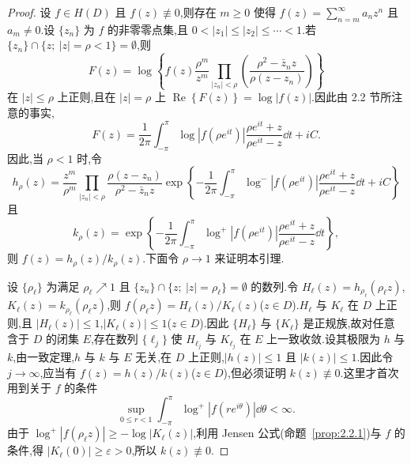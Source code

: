 \begin{proof}
设 $f \in H(D)$ 且 $f(z) \not\equiv 0$,则存在 $m \geq 0$ 使得 $f(z) = \sum_{n=m}^{\infty}a_{n}z^{n}$ 且 $a_{m} \neq 0$.设 $\{z_{n}\}$ 为 $f$ 的非零零点集,且 $0 < |z_{1}| \leq |z_{2}| \leq \cdots < 1$.若 $\{z_{n}\} \cap \{z;\ |z| = \rho < 1\} = \emptyset$,则
\begin{equation*}
F(z) = \log\left\{f(z)\frac{\rho^{m}}{z^{m}}\prod_{|z_{n}| < \rho}\left(\frac{\rho^{2} - \bar{z}_{n}z}{\rho(z - z_{n})}\right)\right\}
\end{equation*}
在 $|z| \leq \rho$ 上正则,且在 $|z| = \rho$ 上 $\operatorname{Re}\left\{F(z)\right\} = \log|f(z)|$.因此由 2.2 节所注意的事实,
\begin{equation*}
F(z) = \frac{1}{2\pi}\int_{-\pi}^{\pi}\log|f(\rho e^{it})|\frac{\rho e^{it} + z}{\rho e^{it} - z}\dd t + iC.
\end{equation*}
因此,当 $\rho < 1$ 时,令
\begin{equation*}
h_{\rho}(z) = \frac{z^{m}}{\rho^{m}}\prod_{|z_{n}| < \rho}\frac{\rho(z - z_{n})}{\rho^{2} - \bar{z}_{n}z}\exp\left\{-\frac{1}{2\pi}\int_{-\pi}^{\pi}\log^{-}|f(\rho e^{it})|\frac{\rho e^{it} + z}{\rho e^{it} - z}\dd t + iC\right\}
\end{equation*}
且
\begin{equation*}
k_{\rho}(z) = \exp\left\{-\frac{1}{2\pi}\int_{-\pi}^{\pi}\log^{+}|f(\rho e^{it})|\frac{\rho e^{it} + z}{\rho e^{it} - z}\dd t\right\},
\end{equation*}
则 $f(z) = h_{\rho}(z)/k_{\rho}(z)$.下面令 $\rho \to 1$ 来证明本引理.

设 $\{\rho_{\ell}\}$ 为满足 $\rho_{\ell} \nearrow 1$ 且 $\{z_{n}\} \cap \{z;\ |z| = \rho_{\ell}\} = \emptyset$ 的数列.令 $H_{\ell}(z) = h_{\rho_{\ell}}(\rho_{\ell}z)$,$K_{\ell}(z) = k_{\rho_{\ell}}(\rho_{\ell}z)$,则 $f(\rho_{\ell}z) = H_{\ell}(z)/K_{\ell}(z)$($z \in D$).$H_{\ell}$ 与 $K_{\ell}$ 在 $D$ 上正则,且 $|H_{\ell}(z)| \leq 1$,$|K_{\ell}(z)| \leq 1$($z \in D$).因此 $\{H_{\ell}\}$ 与 $\{K_{\ell}\}$ 是正规族,故对任意含于 $D$ 的闭集 $E$,存在数列 $\{\ell_{j}\}$ 使 $H_{\ell_{j}}$ 与 $K_{\ell_{j}}$ 在 $E$ 上一致收敛.设其极限为 $h$ 与 $k$,由一致定理,$h$ 与 $k$ 与 $E$ 无关,在 $D$ 上正则,$|h(z)| \leq 1$ 且 $|k(z)| \leq 1$.因此令 $j \to \infty$,应当有 $f(z) = h(z)/k(z)$($z \in D$),但必须证明 $k(z) \not\equiv 0$.这里才首次用到关于 $f$ 的条件
\begin{equation*}
\sup_{0 \leq r < 1}\int_{-\pi}^{\pi}\log^{+}|f(re^{i\theta})|\dd\theta < \infty.
\end{equation*}
由于 $\log^{+}|f(\rho_{\ell}z)| \geq -\log|K_{\ell}(z)|$,利用 Jensen 公式(命题~\ref{prop:2.2.1})与 $f$ 的条件,得 $|K_{\ell}(0)| \geq \varepsilon > 0$,所以 $k(z) \not\equiv 0$.
\end{proof}

